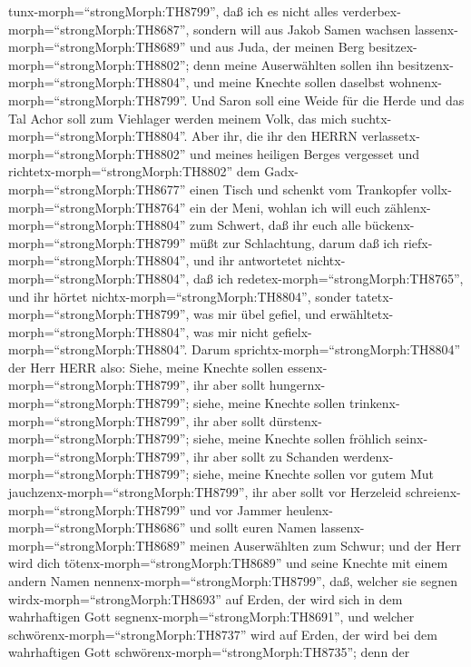 tunx-morph=``strongMorph:TH8799'', daß ich es nicht alles
verderbex-morph=``strongMorph:TH8687'',  sondern will aus
Jakob Samen wachsen lassenx-morph=``strongMorph:TH8689'' und aus Juda,
der meinen Berg besitzex-morph=``strongMorph:TH8802''; denn meine
Auserwählten sollen ihn besitzenx-morph=``strongMorph:TH8804'', und
meine Knechte sollen daselbst wohnenx-morph=``strongMorph:TH8799''.
 Und Saron soll eine Weide für die Herde und das Tal Achor
soll zum Viehlager werden meinem Volk, das mich
suchtx-morph=``strongMorph:TH8804''.  Aber ihr, die ihr den
HERRN verlassetx-morph=``strongMorph:TH8802'' und meines heiligen Berges
vergesset und richtetx-morph=``strongMorph:TH8802'' dem
Gadx-morph=``strongMorph:TH8677'' einen Tisch und schenkt vom Trankopfer
vollx-morph=``strongMorph:TH8764'' ein der Meni,  wohlan
ich will euch zählenx-morph=``strongMorph:TH8804'' zum Schwert, daß ihr
euch alle bückenx-morph=``strongMorph:TH8799'' müßt zur Schlachtung,
darum daß ich riefx-morph=``strongMorph:TH8804'', und ihr antwortetet
nichtx-morph=``strongMorph:TH8804'', daß ich
redetex-morph=``strongMorph:TH8765'', und ihr hörtet
nichtx-morph=``strongMorph:TH8804'', sonder
tatetx-morph=``strongMorph:TH8799'', was mir übel gefiel, und
erwähltetx-morph=``strongMorph:TH8804'', was mir nicht
gefielx-morph=``strongMorph:TH8804''.  Darum
sprichtx-morph=``strongMorph:TH8804'' der Herr HERR also: Siehe, meine
Knechte sollen essenx-morph=``strongMorph:TH8799'', ihr aber sollt
hungernx-morph=``strongMorph:TH8799''; siehe, meine Knechte sollen
trinkenx-morph=``strongMorph:TH8799'', ihr aber sollt
dürstenx-morph=``strongMorph:TH8799''; siehe, meine Knechte sollen
fröhlich seinx-morph=``strongMorph:TH8799'', ihr aber sollt zu Schanden
werdenx-morph=``strongMorph:TH8799'';  siehe, meine Knechte
sollen vor gutem Mut jauchzenx-morph=``strongMorph:TH8799'', ihr aber
sollt vor Herzeleid schreienx-morph=``strongMorph:TH8799'' und vor
Jammer heulenx-morph=``strongMorph:TH8686''  und sollt
euren Namen lassenx-morph=``strongMorph:TH8689'' meinen Auserwählten zum
Schwur; und der Herr wird dich tötenx-morph=``strongMorph:TH8689'' und
seine Knechte mit einem andern Namen
nennenx-morph=``strongMorph:TH8799'',  daß, welcher sie
segnen wirdx-morph=``strongMorph:TH8693'' auf Erden, der wird sich in
dem wahrhaftigen Gott segnenx-morph=``strongMorph:TH8691'', und welcher
schwörenx-morph=``strongMorph:TH8737'' wird auf Erden, der wird bei dem
wahrhaftigen Gott schwörenx-morph=``strongMorph:TH8735''; denn der
